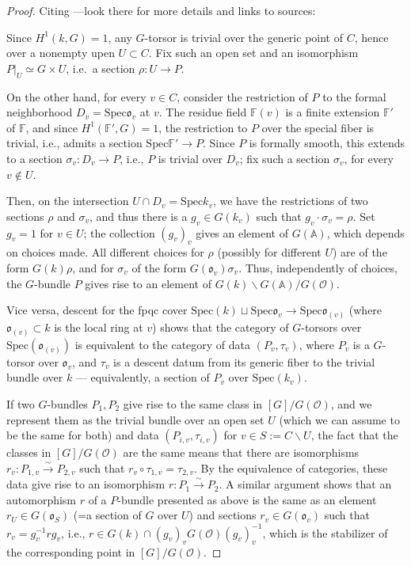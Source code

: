 \begin{proof}
Citing \cite[112593]{Mathoverflow}---look there for more details and links to sources:

Since $H^1(k,G)=1$, any $G$-torsor is trivial over the generic point of $C$, hence over a nonempty upen $U\subset C$. Fix such an open set and an isomorphism $P|_{U} \simeq G\times U$, i.e.\ a section $\rho: U \to P$. 

On the other hand, for every $v\in C$, consider the restriction of $P$ to the formal neighborhood $D_v = \text{Spec} \mathfrak o_v$ at $v$. The residue field $\mathbb F(v)$ is a finite extension $\mathbb F'$ of $\mathbb F$, and since $H^1(\mathbb F',G)=1$, the restriction to $P$ over the special fiber is trivial, i.e., admits a section $\text{Spec} \mathbb F' \to P$. Since $P$ is formally smooth, this extends to a section $\sigma_v: D_v \to P$, i.e., $P$ is trivial over $D_v$; fix such a section $\sigma_v$, for every $v \notin U$. 
 
Then, on the intersection $U\cap D_v = \text{Spec} k_v$, we have the restrictions of two sections $\rho$ and $\sigma_v$, and thus there is a $g_v\in G(k_v)$ such that $g_v\cdot \sigma_v = \rho$. Set $g_v=1$ for $v\in U$; the collection $(g_v)_v$ gives an element of $G(\mathbb A)$, which depends on choices made. All different choices for $\rho$ (possibly for different $U$) are of the form $G(k)\rho$, and for $\sigma_v$ of the form $G(\mathfrak o_v) \sigma_v$. Thus, independently of choices, the $G$-bundle $P$ gives rise to an element of $G(k)\backslash G(\mathbb A)/G(\mathcal O)$.

Vice versa, descent for the fpqc cover $\text{Spec}(k) \sqcup \text{Spec} \mathfrak o_v \to \text{Spec} \mathfrak o_{(v)}$ (where $\mathfrak o_{(v)}\subset k$ is the local ring at $v$) shows that the category of $G$-torsors over $\text{Spec}(\mathfrak o_{(v)})$ is equivalent to the category of data $(P_v, \tau_v)$, where $P_v$ is a $G$-torsor over $\mathfrak o_v$, and $\tau_v$ is a descent datum from its generic fiber to the trivial bundle over $k$ --- equivalently, a section of $P_v$ over $\text{Spec}(k_v)$. 

If two $G$-bundles $P_1, P_2$ give rise to the same class in $[G]/G(\mathcal O)$, and we represent them as the trivial bundle over an open set $U$ (which we can assume to be the same for both) and data $(P_{i,v}, \tau_{i,v})$ for $v\in S:= C\smallsetminus U$, the fact that the classes in $[G]/G(\mathcal O)$ are the same means that there are isomorphisms $r_v: P_{1,v}\xrightarrow\sim P_{2,v}$ such that $r_v\circ \tau_{1,v} = \tau_{2,v}$. By the equivalence of categories, these data give rise to an isomorphism $r:P_1\xrightarrow\sim P_2$. A similar argument shows that an automorphism $r$ of a $P$-bundle presented as above is the same as an element $r_U \in G(\mathfrak o_S)$ (=a section of $G$ over $U$) and sections $r_v \in G(\mathfrak o_v)$ such that $r_v = g_v^{-1} r g_v$, i.e., $r\in G(k)\cap (g_v)_v G(\mathcal O) (g_v)_v^{-1}$, which is the stabilizer of the corresponding point in $[G]/G(\mathcal O)$.


\end{proof}
